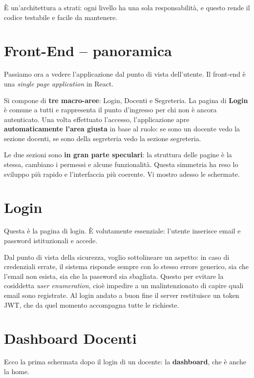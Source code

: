 \documentclass[11pt]{article}
\begin{document}
È un'architettura a strati: ogni livello ha una sola responsabilità, e questo rende il
codice testabile e facile da mantenere.

\section*{Front-End -- panoramica}

Passiamo ora a vedere l'applicazione dal punto di vista dell'utente. Il front-end è una
\emph{single page application} in React.

Si compone di \textbf{tre macro-aree}: Login, Docenti e Segreteria. La pagina di
\textbf{Login} è comune a tutti e rappresenta il punto d'ingresso per chi non è ancora
autenticato. Una volta effettuato l'accesso, l'applicazione apre \textbf{automaticamente
l'area giusta} in base al ruolo: se sono un docente vedo la sezione docenti, se sono
della segreteria vedo la sezione segreteria.

Le due sezioni sono \textbf{in gran parte speculari}: la struttura delle pagine è la
stessa, cambiano i permessi e alcune funzionalità. Questa simmetria ha reso lo sviluppo
più rapido e l'interfaccia più coerente. Vi mostro adesso le schermate.

\section*{Login}

Questa è la pagina di login. È volutamente essenziale: l'utente inserisce email e
password istituzionali e accede.

Dal punto di vista della sicurezza, voglio sottolineare un aspetto: in caso di
credenziali errate, il sistema risponde sempre con lo stesso errore generico, sia che
l'email non esista, sia che la password sia sbagliata. Questo per evitare la cosiddetta
\emph{user enumeration}, cioè impedire a un malintenzionato di capire quali email sono
registrate. Al login andato a buon fine il server restituisce un token JWT, che da quel
momento accompagna tutte le richieste.

\section*{Dashboard Docenti}

Ecco la prima schermata dopo il login di un docente: la \textbf{dashboard}, che è anche
la home.
\end{document}
